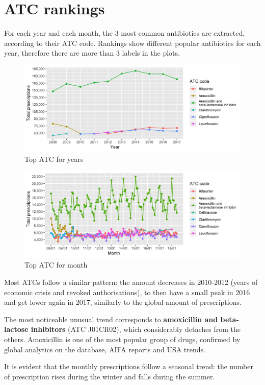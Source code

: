 \section{ATC rankings}
For each year and each month, the 3 most common antibiotics are extracted, according to their ATC code. Rankings show different popular antibiotics for each year, therefore there are more than 3 labels in the plots. 
\begin{figure}[h]
	\centering
	\includegraphics[scale=0.3]{../plots/top_atc-year.png}
	\caption{\small Top ATC for years}
\end{figure}

\begin{figure}[h]
	\centering
	\includegraphics[scale=0.3]{../plots/top_atc-month.png}
	\caption{\small Top ATC for month}
\end{figure}

Most ATCs follow a similar pattern: the amount decreases in 2010-2012 (years of economic crisis and revoked authorisations), to then have a small peak in 2016 and get lower again in 2017, similarly to the global amount of prescriptions.

The most noticeable unusual trend corresponds to \textbf{amoxicillin and beta-lactose inhibitors} (ATC J01CR02), which considerably detaches from the others. Amoxicillin is one of the most popular group of drugs, confirmed by global analytics on the database, AIFA reports and USA trends\cite{usa}.

It is evident that the monthly prescriptions follow a seasonal trend: the number of prescription rises during the winter and falls during the summer.

